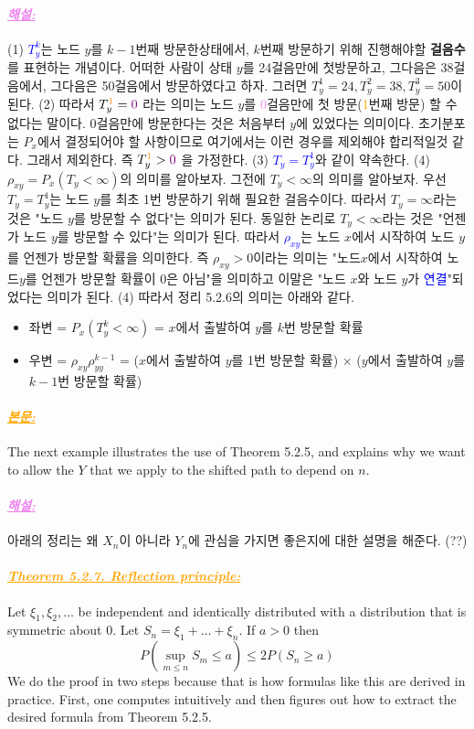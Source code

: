 \documentclass[12pt,oneside,english,a4paper]{article}
\newcommand{\paraviolet}[1]{\paragraph{\LARGE\textcolor{violet}{\it\underline{\textbf{#1:}}}}\LARGE}
\newcommand{\paraorange}[1]{\paragraph{\LARGE\textcolor{orange}{\it\underline{\textbf{#1:}}}}\LARGE}
\begin{document}
\paraviolet{해설} (1) \textcolor{blue}{$T_y^k$}는 노드 $y$를 $k-1$번째 방문한상태에서, $k$번째 방문하기 위해 진행해야할 \textbf{걸음수}를 표현하는 개념이다. 어떠한 사람이 상태 $y$를 24걸음만에 첫방문하고, 그다음은 38걸음에서, 그다음은 50걸음에서 방문하였다고 하자. 그러면 $T_y^1=24, T_y^2=38, T_y^3=50$이 된다. (2) 따라서 $T_y^{\textcolor{orange}{1}}=\textcolor{violet}{0}$ 라는 의미는 노드 $y$를 \textcolor{violet}{0}걸음만에 첫 방문(\textcolor{orange}{1}번째 방문) 할 수 없다는 말이다. $0$걸음만에 방문한다는 것은 처음부터 $y$에 있었다는 의미이다. 초기분포는 $P_x$에서 결정되어야 할 사항이므로 여기에서는 이런 경우를 제외해야 합리적일것 같다. 그래서 제외한다. 즉 $T_y^{\textcolor{orange}{1}}>\textcolor{violet}{0}$ 을 가정한다. (3) \textcolor{blue}{$T_y=T_y^1$}와 같이 약속한다. (4) {$\rho_{xy}=P_x(T_y<\infty)$}의 의미를 알아보자. 그전에 $T_y<\infty$의 의미를 알아보자. 우선 $T_y=T_y^1$는 노드 $y$를 최초 1번 방문하기 위해 필요한 걸음수이다. 따라서 $T_y=\infty$라는 것은 "노드 $y$를 방문할 수 없다"는 의미가 된다. 동일한 논리로 $T_y<\infty$라는 것은 "언젠가 노드 $y$를 방문할 수 있다"는 의미가 된다. 따라서 \textcolor{blue}{$\rho_{xy}$}는 노드 $x$에서 시작하여 노드 $y$를 언젠가 방문할 확률을 의미한다. 즉 $\rho_{xy}>0$이라는 의미는 "노드$x$에서 시작하여 노드$y$를 언젠가 방문할 확률이 $0$은 아님"을 의미하고 이말은 "노드 $x$와 노드 $y$가 \textcolor{blue}{연결}"되었다는 의미가 된다. (4) 따라서 정리 5.2.6의 의미는 아래와 같다. 
\begin{itemize}
	\item 좌변 = $P_x(T_y^k<\infty)$ = $x$에서 출발하여 $y$를 $k$번 방문할 확률
	\item 우변 = $\rho_{xy}\rho_{yy}^{k-1}$ = ($x$에서 출발하여 $y$를 1번 방문할 확률) $\times$ ($y$에서 출발하여 $y$를 $k-1$번 방문할 확률)
\end{itemize}

\paraorange{본문} The next example illustrates the use of Theorem 5.2.5, and explains why we want to allow the $Y$ that we apply to the shifted path to depend on $n$. 

\paraviolet{해설} 아래의 정리는 왜 $X_n$이 아니라 $Y_n$에 관심을 가지면 좋은지에 대한 설명을 해준다. (??)

\paraorange{Theorem 5.2.7. Reflection principle} Let $\xi_1,\xi_2,\dots$ be independent and identically distributed with a distribution that is symmetric about $0$. Let $S_n=\xi_1+\dots+\xi_n$. If $a > 0$ then
\[
P\left(\sup_{m\leq n} S_m \leq a\right) \leq 2P(S_n \geq a)
\]
We do the proof in two steps because that is how formulas like this are
derived in practice. First, one computes intuitively and then figures out
how to extract the desired formula from Theorem 5.2.5.
\end{document}
